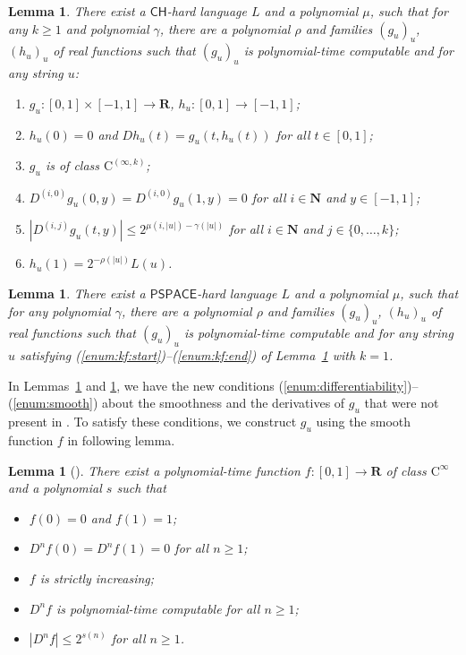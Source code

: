 \documentclass{lmcs}
\newtheorem{lemma}[theorem]{Lemma}
\theoremstyle{definition}
\theoremstyle{remark}
\newcommand{\R}{\mathbf R}
\newcommand{\N}{\mathbf N}
\newcommand{\D}{D}
\newcommand{\classPSPACE}{\mathsf{PSPACE}}
\newcommand{\classCH}{\mathsf{CH}}
\newcommand{\classC}{\mathrm C}
\begin{document}
 \begin{lemma}
  \label{KTimesFamily}
  There exist a $\classCH$-hard language $L$ and a polynomial $\mu$,
  such that for any $k \ge 1$ and polynomial $\gamma$,
  there are a polynomial $\rho$ and families $(g_u)_u$, $(h_u)_u$ of real functions
  such that $(g_u)_u$ is polynomial-time computable and for any string $u$:
  \begin{enumerate}
   \item \label{enum:kf:start}
	 $g_u\colon [0,1] \times [-1,1]\to \R$, $h_u\colon [0,1] \to [-1,1]$;
   \item \label{enum:equation}
	 $h_u(0) = 0$ and $\D h_u(t) = g_u(t, h_u(t))$ for all $t \in [0,1]$;
   \item \label{enum:differentiability}
         $g_u$ is of class $\classC^{(\infty, k)}$;
   \item \label{enum:boundary}
	 $
	 \D^{(i, 0)} g_u(0,y) = \D^{(i, 0)} g_u(1,y) = 0
         $ for all $i \in \N$ and $y \in [-1,1]$;
   \item \label{enum:smooth}
	 $
	 \left|\D^{(i,j)} g_u(t,y)\right| \le 2^{\mu(i, |u|) - \gamma(|u|)}
         $ for all $i \in \N$ and $j \in \{0, \dots, k\}$;
   \item \label{enum:kf:end}
	 $h_u(1) = 2^{-\rho(|u|)} L(u)$.
  \end{enumerate}
 \end{lemma}

\begin{lemma}
 \label{DifferentiableFamily}
 There exist a $\classPSPACE$-hard language $L$ and a polynomial $\mu$,
 such that for any polynomial $\gamma$,
 there are a polynomial $\rho$ and families $(g_u)_u$, $(h_u)_u$ of real functions
 such that $(g_u)_u$ is polynomial-time computable and for any string $u$
 satisfying (\ref{enum:kf:start})--(\ref{enum:kf:end}) of Lemma~\ref{KTimesFamily} with $k = 1$.
\end{lemma}


In Lemmas~\ref{KTimesFamily} and \ref{DifferentiableFamily}, 
we have the new conditions (\ref{enum:differentiability})--(\ref{enum:smooth})
about the smoothness and the derivatives of $g_u$ 
that were not present in \cite[Lemma 4.1]{kawamura2010lipschitz}.
To satisfy these conditions,
we construct $g_u$ using the smooth function $f$ in following lemma.

\begin{lemma}[{\cite[Lemma 3.6]{ko1991complexity}}]
 \label{SmoothFunction}
 There exist 
 a polynomial-time function $f \colon [0, 1] \to \R$ of class $\classC^\infty$ and 
 a polynomial $s$ such that
  \begin{itemize}
   \item $f(0) = 0$ and $f(1) = 1$;
   \item $\D ^n f (0) = \D ^n f (1) = 0$ for all $n \ge 1$;
   \item $f$ is strictly increasing;
   \item $\D ^n f$ is polynomial-time computable for all $n \ge 1$;
   \item $|\D^n f| \le 2^{s(n)}$ for all $n \ge 1$. 
  \end{itemize}
 \end{lemma}
\end{document}
